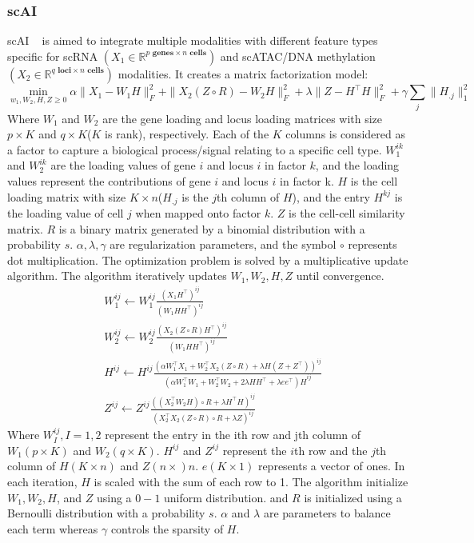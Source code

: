 \subsubsection{scAI}
scAI ~\citep{jin2020scai} is aimed to integrate multiple modalities with different feature types specific for scRNA $(X_1\in \mathbb{R}^{p \textbf{ genes} \times n \textbf{ cells}})$ and scATAC/DNA methylation$(X_2\in \mathbb{R}^{q \textbf{ loci}\times n \textbf{ cells}})$ modalities. It creates a matrix factorization model:
\begin{equation}
\min_{w_1,W_2,H,Z\geq 0} \alpha \|X_1-W_1H\|_F^2 + \|X_2(Z \circ R)-W_2H\|_F^2 + \lambda \|Z-H^\top H\|_F^2 + \gamma\sum_j \|H_{.j}\|_1^2
\end{equation}
Where $W_1$ and $W_2$ are the gene loading and locus loading matrices with size $p\times K$ and $q\times K$($K$ is rank), respectively. Each of the $K$ columns is considered as a factor to capture a biological process/signal relating to a specific cell type. $W_1^{ik}$ and $W_2^{ik}$ are the loading values of gene $i$ and locus $i$ in factor $k$, and the loading values represent the contributions of gene $i$ and locus $i$ in factor k. $H$ is the cell loading matrix with size $K\times n$($H_{.j}$ is the $j$th column of $H$), and the entry $H^{kj}$ is the loading value of cell $j$ when mapped onto factor $k$. $Z$ is the cell-cell similarity matrix. $R$ is a binary matrix generated by a binomial distribution with a probability $s$. $\alpha, \lambda, \gamma$ are regularization parameters, and the symbol $\circ$ represents dot multiplication.
The optimization problem is solved by a multiplicative update algorithm. The algorithm iteratively updates $W_1, W_2, H, Z$ until convergence. 
\begin{equation}
	\begin{aligned}
	&W_1^{ij} \leftarrow W_1^{ij} \frac{{(X_1 H^\top)}^{ij}}{{(W_1 H H^\top)}^{ij} } \\
	&W_2^{ij} \leftarrow W_2^{ij} \frac{{(X_2(Z \circ R)H^\top)}^{ij}}{{(W_1 H H^\top)}^{ij}} \\
	&H^{ij} \leftarrow H^{ij} \frac{{(\alpha W_1^\top X_1 + W_2^\top X_2 (Z\circ R) + \lambda H(Z+Z^\top))}^{ij}}{{(\alpha W_1^\top W_1 + W_2^\top W_2 + 2 \lambda H H ^\top + \lambda e e^\top )H}^{ij}} \\
	&Z^{ij} \leftarrow Z^{ij} \frac{{((X_2^\top W_2 H)\circ R + \lambda H^\top H)}^{ij}}{{(X_2^\top X_2(Z\circ R) \circ R + \lambda Z)}^{ij}}
	\end{aligned}
\end{equation}
Where $W_I^{ij}, I = 1,2$ represent the entry in the ith row and jth column of $W_1(p\times K)$ and $W_2(q\times K)$. $H^{ij}$ and $Z^{ij}$ represent the $i$th row and the $j$th column of $H(K\times n)$ and $Z(n\times) n$. $e(K\times 1)$ represents a vector of ones. In each iteration, $H$ is scaled with the sum of each row to 1. The algorithm initialize $W_1, W_2,H$, and $Z$ using a $0-1$ uniform distribution. and $R$ is initialized using a Bernoulli distribution with a probability $s$. $\alpha$ and $\lambda$ are parameters to balance each term whereas $\gamma$ controls the sparsity of $H$.

